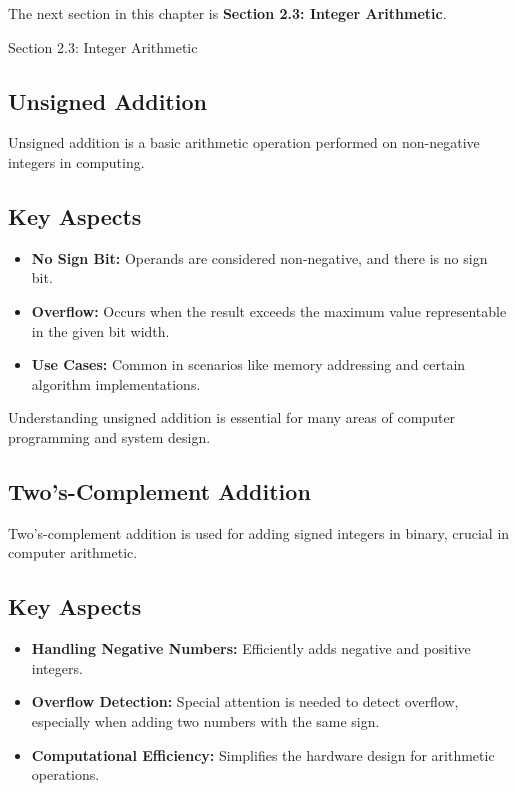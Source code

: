 The next section in this chapter is \textbf{Section 2.3: Integer Arithmetic}.

\begin{notes}{Section 2.3: Integer Arithmetic}
    \subsection*{Unsigned Addition}

    Unsigned addition is a basic arithmetic operation performed on non-negative integers in computing. \vspace*{1em}
    
    \subsection*{Key Aspects}

    \begin{itemize}
        \item \textbf{No Sign Bit:} Operands are considered non-negative, and there is no sign bit.
        \item \textbf{Overflow:} Occurs when the result exceeds the maximum value representable in the given bit width.
        \item \textbf{Use Cases:} Common in scenarios like memory addressing and certain algorithm implementations.
    \end{itemize}
    
    Understanding unsigned addition is essential for many areas of computer programming and system design.
    
    \subsection*{Two's-Complement Addition}

    Two's-complement addition is used for adding signed integers in binary, crucial in computer arithmetic.

    \subsection*{Key Aspects}
    
    \begin{itemize}
        \item \textbf{Handling Negative Numbers:} Efficiently adds negative and positive integers.
        \item \textbf{Overflow Detection:} Special attention is needed to detect overflow, especially when adding two numbers with the same sign.
        \item \textbf{Computational Efficiency:} Simplifies the hardware design for arithmetic operations.
    \end{itemize}
    

\end{notes}
